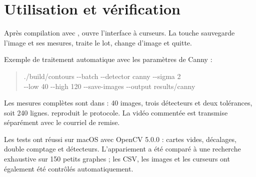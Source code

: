 \section{Utilisation et vérification}
Après compilation avec ,  ouvre l'interface à curseurs. La touche  sauvegarde l'image et ses mesures,  traite le lot,  change d'image et  quitte.

Exemple de traitement automatique avec les paramètres de Canny :
\begin{quote}\small\ttfamily
./build/contours -{}-batch -{}-detector canny -{}-sigma 2\\
\hspace*{1em}-{}-low 40 -{}-high 120 -{}-save-images -{}-output results/canny
\end{quote}
Les mesures complètes sont dans  : 40 images, trois détecteurs et deux tolérances, soit 240 lignes.  reproduit le protocole. La vidéo commentée est transmise séparément avec le courriel de remise.

Les tests ont réussi sur macOS avec OpenCV 5.0.0 : cartes vides, décalages, double comptage et détecteurs. L'appariement a été comparé à une recherche exhaustive sur 150 petits graphes ; les CSV, les images et les curseurs ont également été contrôlés automatiquement.
